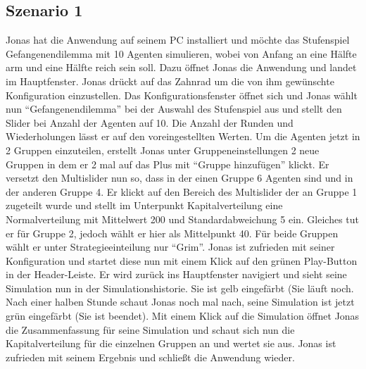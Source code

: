 \documentclass[parskip=full,11pt]{scrartcl}
\begin{document}
\subsection{Szenario 1}
Jonas hat die Anwendung auf seinem PC installiert und möchte das Stufenspiel Gefangenendilemma mit 10 Agenten simulieren, wobei von Anfang an eine Hälfte arm und eine Hälfte reich sein soll. Dazu öffnet Jonas die Anwendung und landet im Hauptfenster. Jonas drückt auf das Zahnrad um die von ihm gewünschte Konfiguration einzustellen. Das Konfigurationsfenster öffnet sich und Jonas wählt nun \enquote{Gefangenendilemma} bei der Auswahl des Stufenspiel aus und stellt den Slider bei Anzahl der Agenten auf 10. Die Anzahl der Runden und Wiederholungen lässt er auf den voreingestellten Werten. 
Um die Agenten jetzt in 2 Gruppen einzuteilen, erstellt Jonas unter Gruppeneinstellungen 2 neue Gruppen in dem er 2 mal auf das Plus mit \enquote{Gruppe hinzufügen} klickt. Er versetzt den Multislider nun so, dass in der einen Gruppe 6 Agenten sind und in der anderen Gruppe 4. Er klickt auf den Bereich des Multislider der an Gruppe 1 zugeteilt wurde und stellt im Unterpunkt Kapitalverteilung eine Normalverteilung mit Mittelwert 200 und Standardabweichung 5 ein. Gleiches tut er für Gruppe 2, jedoch wählt er hier als Mittelpunkt 40. Für beide Gruppen wählt er unter Strategieeinteilung nur \enquote{Grim}.
Jonas ist zufrieden mit seiner Konfiguration und startet diese nun mit einem Klick auf den grünen Play-Button in der Header-Leiste.
Er wird zurück ins Hauptfenster navigiert und sieht seine Simulation nun in der Simulationshistorie. Sie ist gelb eingefärbt (Sie läuft noch. Nach einer halben Stunde schaut Jonas noch mal nach, seine Simulation ist jetzt grün eingefärbt (Sie ist beendet). Mit einem Klick auf die Simulation öffnet Jonas die Zusammenfassung für seine Simulation und schaut sich nun die Kapitalverteilung für die einzelnen Gruppen an und wertet sie aus. Jonas ist zufrieden mit seinem Ergebnis und schließt die Anwendung wieder.
\end{document}
